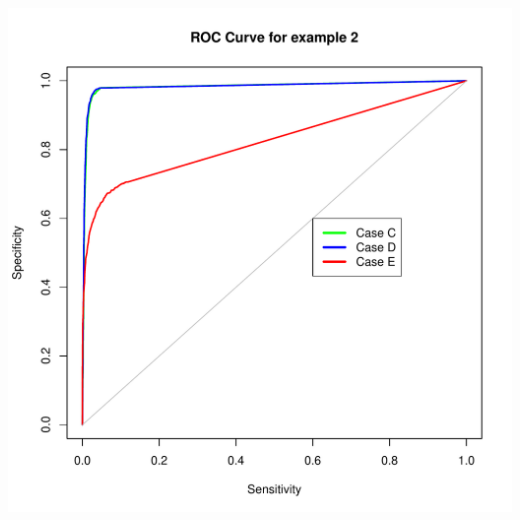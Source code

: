\documentclass{article}\usepackage[]{graphicx}\usepackage[]{color}
\makeatletter
\def\maxwidth{ %
  \ifdim\Gin@nat@width>\linewidth
    \linewidth
  \else
    \Gin@nat@width
  \fi
}
\newenvironment{knitrout}{}{} %
\makeatother
\begin{document}
\begin{knitrout}
\color{fgcolor}
\includegraphics[width=\maxwidth]{figure/unnamed-chunk-6-1} 

\end{knitrout}
\end{document}
